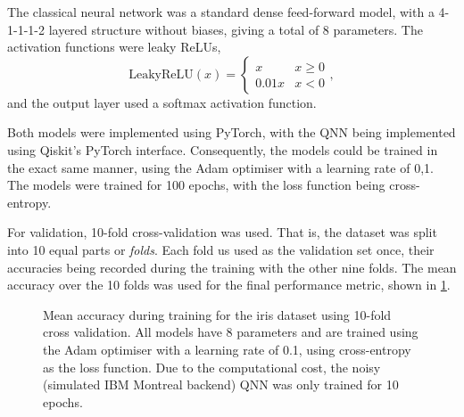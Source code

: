 The classical neural network was a standard dense feed-forward model, with a 4-1-1-1-2 layered structure without biases, giving a total of 8 parameters. The activation functions were leaky ReLUs,
\begin{equation}
    \text{LeakyReLU}(x) = \begin{cases}
        x     & x \geq 0 \\
        0.01x & x < 0
    \end{cases},
\end{equation}
and the output layer used a softmax activation function.

Both models were implemented using PyTorch, with the QNN being implemented using Qiskit's PyTorch interface. Consequently, the models could be trained in the exact same manner, using the Adam optimiser with a learning rate of 0,1. The models were trained for 100 epochs, with the loss function being cross-entropy.

For validation, 10-fold cross-validation was used. That is, the dataset was split into 10 equal parts or \textit{folds}. Each fold us used as the validation set once, their accuracies being recorded during the training with the other nine folds. The mean accuracy over the 10 folds was used for the final performance metric, shown in \cref{fig:iris_training}.

\begin{figure}
    \centering
    \caption{Mean accuracy during training for the iris dataset using 10-fold cross validation. All models have 8 parameters and are trained using the Adam optimiser with a learning rate of 0.1, using cross-entropy as the loss function. Due to the computational cost, the noisy (simulated IBM Montreal backend) QNN was only trained for 10 epochs.}
    \label{fig:iris_training}
\end{figure}


